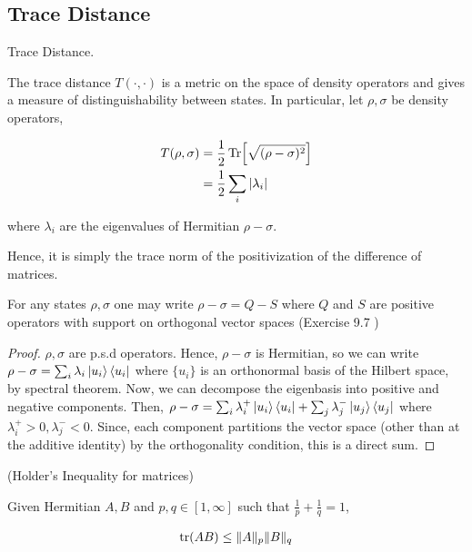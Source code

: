\documentclass[main.tex]{subfiles}
\begin{document}
\subsection{Trace Distance}
\label{sec:trace-distance}

\begin{definition}
Trace Distance.

The trace distance $T(\cdot , \cdot)$ is a metric on the space of density operators and gives a measure of distinguishability between states. In particular, let $\rho, \sigma$ be density operators,

\begin{align*}
	T(\rho, \sigma) &= \frac{1}{2} \Tr [\sqrt{(\rho - \sigma)^2}] \\
	&= \frac{1}{2} \sum_i |\lambda_i|
\end{align*}

where $\lambda_i$ are the eigenvalues of Hermitian $\rho - \sigma$.

Hence, it is simply the trace norm of the positivization of the difference of matrices.

\end{definition}

\begin{lemma}
\label{lem:nc97}
For any states $\rho, \sigma$ one may write $\rho - \sigma = Q - S$ where $Q$ and $S$ are positive operators with support on orthogonal vector spaces	(Exercise 9.7 \cite{nielsen2010quantum})
\end{lemma}

\begin{proof}
$\rho, \sigma$ are p.s.d operators. Hence, $\rho - \sigma$ is Hermitian, so we can write $\rho - \sigma = \sum_i \lambda_i \ket{u_i}\bra{u_i}$ where $\{ u_i \}$ is an orthonormal basis of the Hilbert space, by spectral theorem. Now, we can decompose the eigenbasis into positive and negative components. Then, $\rho - \sigma = \sum_i \lambda^+_i \ket{u_i}\bra{u_i} + \sum_j \lambda^-_j\ket{u_j}\bra{u_j}$ where $\lambda^+_i >0, \lambda^-_j < 0$. Since, each component partitions the vector space (other than at the additive identity) by the orthogonality condition, this is a direct sum.
\end{proof}


\begin{lemma}
\label{lem:holder}
	(Holder's Inequality for matrices)

	Given Hermitian $A, B$ and $p,q \in [1, \infty]$ such that $\frac{1}{p}+\frac{1}{q} = 1$,

	\begin{align*}
	\tr(AB) \leq \|A\|_p\|B\|_q
	\end{align*}
\end{lemma}
\end{document}
